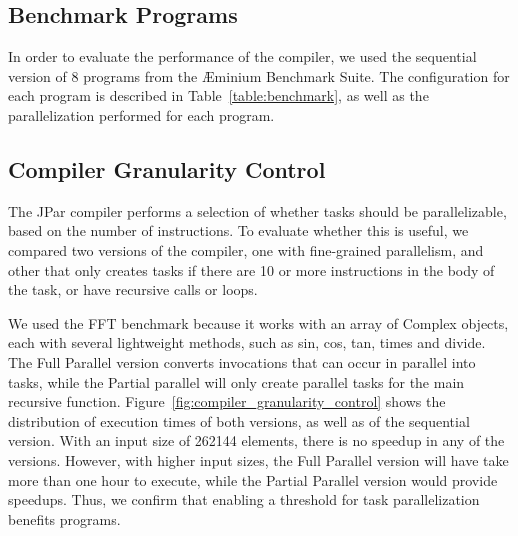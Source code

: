 \documentclass[smallextended]{svjour3}
\begin{document}
\subsection{Benchmark Programs}

In order to evaluate the performance of the compiler, we used the sequential version of 8 programs from the Æminium Benchmark Suite\cite{aebenchmarks}. The configuration for each program is described in Table~\ref{table:benchmark}, as well as the parallelization performed for each program.


\subsection{Compiler Granularity Control}

The JPar compiler performs a selection of whether tasks should be parallelizable, based on the number of instructions. To evaluate whether this is useful, we compared two versions of the compiler, one with fine-grained parallelism, and other that only creates tasks if there are 10 or more instructions in the body of the task, or have recursive calls or loops.


We used the FFT benchmark because it works with an array of Complex objects, each with several lightweight methods, such as sin, cos, tan, times and divide. The Full Parallel version converts invocations that can occur in parallel into tasks, while the Partial parallel will only create parallel tasks for the main recursive function. Figure~\ref{fig:compiler_granularity_control} shows the distribution of execution times of both versions, as well as of the sequential version. With an input size of 262144 elements, there is no speedup in any of the versions. However, with higher input sizes, the Full Parallel version will have take more than one hour to execute, while the Partial Parallel version would provide speedups. Thus, we confirm that enabling a threshold for task parallelization benefits programs.
\end{document}
